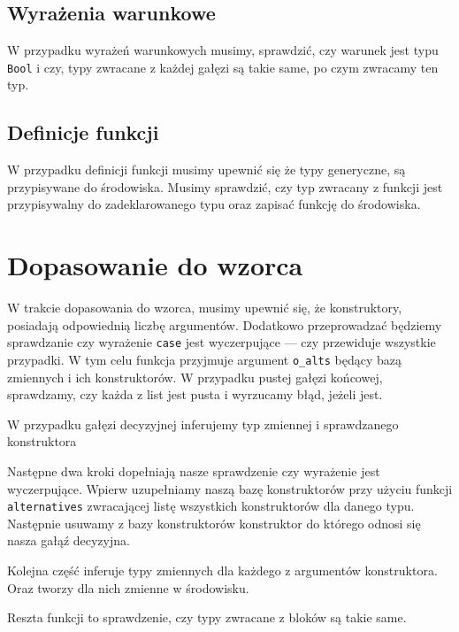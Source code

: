 \documentclass[a4paper,12pt]{book} %
\begin{document}
\subsection{Wyrażenia warunkowe}
W przypadku wyrażeń warunkowych musimy, sprawdzić, czy warunek jest typu \lstinline{Bool} i czy, typy zwracane z każdej gałęzi są takie same, po czym zwracamy ten typ.

\newpage
\subsection{Definicje funkcji}
W przypadku definicji funkcji musimy upewnić się że typy generyczne, są przypisywane do środowiska. Musimy sprawdzić, czy typ zwracany z funkcji jest przypisywalny do zadeklarowanego typu oraz zapisać funkcję do środowiska.



\section{Dopasowanie do wzorca}
W trakcie dopasowania do wzorca, musimy upewnić się, że konstruktory, posiadają odpowiednią liczbę argumentów. Dodatkowo przeprowadzać będziemy sprawdzanie czy wyrażenie \lstinline$case$ jest wyczerpujące --- czy przewiduje wszystkie przypadki. W tym celu funkcja przyjmuje argument \lstinline$o_alts$ będący bazą zmiennych i ich konstruktorów.
\newpage
W przypadku pustej gałęzi końcowej, sprawdzamy, czy każda z list jest pusta i wyrzucamy błąd, jeżeli jest.



W przypadku gałęzi decyzyjnej inferujemy typ zmiennej i sprawdzanego konstruktora

Następne dwa kroki dopełniają nasze sprawdzenie czy wyrażenie jest wyczerpujące. Wpierw uzupełniamy naszą bazę konstruktorów przy użyciu funkcji \lstinline{alternatives} zwracającej listę wszystkich konstruktorów dla danego typu.
Następnie usuwamy z bazy konstruktorów konstruktor do którego odnosi się nasza gałąź decyzyjna.

\newpage
Kolejna część inferuje typy zmiennych dla każdego z argumentów konstruktora.
Oraz tworzy dla nich zmienne w środowisku.

\newpage
Reszta funkcji to sprawdzenie, czy typy zwracane z bloków są takie same.

\end{document}
